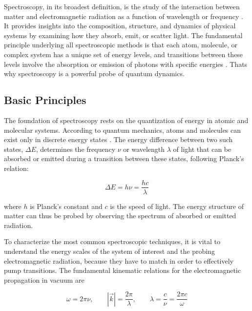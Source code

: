 \noindent 
Spectroscopy, in its broadest definition, is the study of the interaction between matter and electromagnetic radiation as a function of wavelength or frequency \cite{berman2011principleslaserspectroscopy, mukamel1995principlesnonlinearoptical}.
It provides insights into the composition, structure, and dynamics of physical systems by examining how they absorb, emit, or scatter light. The fundamental principle underlying all spectroscopic methods is that each atom, molecule, or complex system has a unique set of energy levels, and transitions between these levels involve the absorption or emission of photons with specific energies \cite{boyd2008chapter1nonlinear}. Thats why spectroscopy is a powerful probe of quantum dynamics.



\subsection{Basic Principles}
\label{subsec:basic_principles}

\noindent The foundation of spectroscopy rests on the quantization of energy in atomic and molecular systems. According to quantum mechanics, atoms and molecules can exist only in discrete energy states \cite{albashetal2012quantumadiabaticmarkovian}. The energy difference between two such states, $\Delta E$, determines the frequency $\nu$ or wavelength $\lambda$ of light that can be absorbed or emitted during a transition between these states, following Planck's relation:

\begin{equation}
	\Delta E = h\nu = \frac{hc}{\lambda}
	\label{eq:planck_relation}
\end{equation}

\noindent
where $h$ is Planck's constant and $c$ is the speed of light. The energy structure of matter can thus be probed by observing the spectrum of absorbed or emitted radiation.

\noindent
To characterize the most common spectroscopic techniques, it is vital to understand the energy scales of the system of interest and the probing electromagnetic radiation, because they have to match in order to effectively pump transitions.
The fundamental kinematic relations for the electromagnetic propagation in vacuum are

\begin{equation}
	\omega = 2\pi\nu, \qquad |\vec{k}| = \frac{2\pi}{\lambda}, \qquad \lambda = \frac{c}{\nu} = \frac{2\pi c}{\omega}
	\label{eq:wavelength_frequency_relation}
\end{equation}

